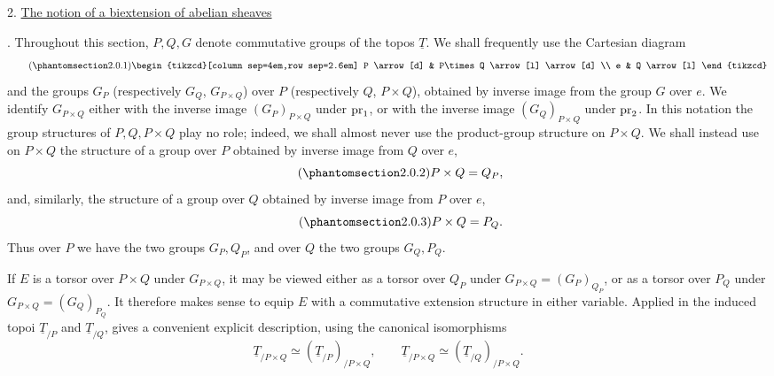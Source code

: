 
2. \underline{The notion of a biextension of abelian sheaves}

. Throughout this section, $P,Q,G$ denote commutative groups of the
topos $\underline T$. We shall frequently use the Cartesian diagram
\begin{equation}\tag{\SGARefTarget{sga7.sga7i.evii.n2-0-1}{2.0.1}}
\begin{tikzcd}[column sep=4em,row sep=2.6em]
 P \arrow[d] & P\times Q \arrow[l] \arrow[d] \\
 e & Q \arrow[l]
\end{tikzcd}
\end{equation}
and the groups $G_P$ (respectively $G_Q$, $G_{P\times Q}$) over $P$
(respectively $Q$, $P\times Q$), obtained by inverse image from the
group $G$ over $e$. We identify $G_{P\times Q}$ either with the inverse
image $(G_P)_{P\times Q}$ under $\operatorname{pr}_1$, or with the inverse image
$(G_Q)_{P\times Q}$ under $\operatorname{pr}_2$. In this notation the group
structures of $P,Q,P\times Q$ play no role; indeed, we shall almost
never use the product-group structure on $P\times Q$. We shall instead
use on $P\times Q$ the structure of a group over $P$ obtained by inverse
image from $Q$ over $e$,
\begin{equation}\tag{\SGARefTarget{sga7.sga7i.evii.n2-0-2}{2.0.2}}
 P\times Q=Q_P,
\end{equation}
and, similarly, the structure of a group over $Q$ obtained by inverse
image from $P$ over $e$,
\begin{equation}\tag{\SGARefTarget{sga7.sga7i.evii.n2-0-3}{2.0.3}}
 P\times Q=P_Q.
\end{equation}
Thus over $P$ we have the two groups $G_P,Q_P$, and over $Q$ the two
groups $G_Q,P_Q$.

If $E$ is a torsor over $P\times Q$ under $G_{P\times Q}$, it may be
viewed either as a torsor over $Q_P$ under
$G_{P\times Q}=(G_P)_{Q_P}$, or as a torsor over $P_Q$ under
$G_{P\times Q}=(G_Q)_{P_Q}$. It therefore makes sense to equip $E$ with
a commutative extension structure in either variable. Applied in the
induced topoi $\underline T_{/P}$ and $\underline T_{/Q}$,  gives
a convenient explicit description, using the canonical isomorphisms
\[
 \underline T_{/P\times Q}\simeq
 (\underline T_{/P})_{/P\times Q},\qquad
 \underline T_{/P\times Q}\simeq
 (\underline T_{/Q})_{/P\times Q}.
\]

